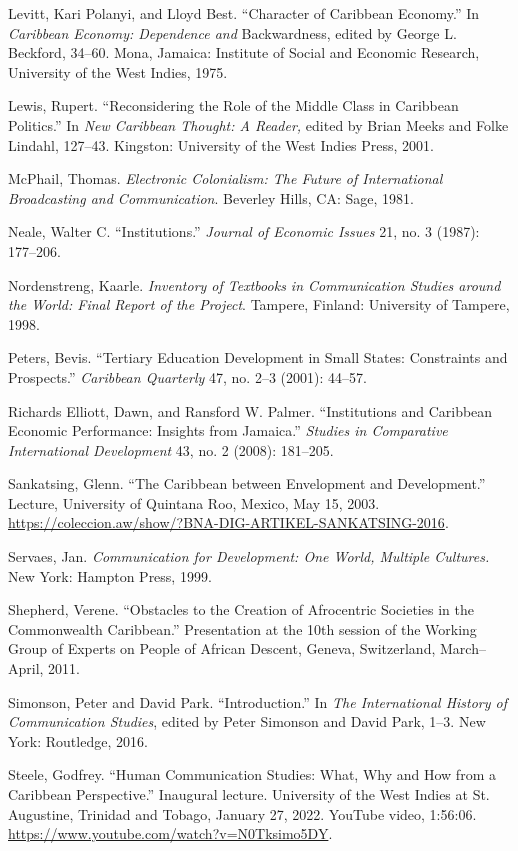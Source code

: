 \documentclass{tufte-handout}
\begin{document}
\begin{hangparas}{.25in}{1}
Levitt, Kari Polanyi, and Lloyd Best. ``Character of Caribbean
Economy.'' In \emph{Caribbean Economy: Dependence and} Backwardness,
edited by George L. Beckford, 34--60. Mona, Jamaica: Institute of Social
and Economic Research, University of the West Indies, 1975.

Lewis, Rupert. ``Reconsidering the Role of the Middle Class in Caribbean
Politics.'' In \emph{New Caribbean Thought: A Reader,} edited by Brian
Meeks and Folke Lindahl, 127--43. Kingston: University of the West
Indies Press, 2001.

McPhail, Thomas. \emph{Electronic Colonialism: The Future of
International Broadcasting and Communication}. Beverley Hills, CA: Sage,
1981.

Neale, Walter C. ``Institutions.'' \emph{Journal of Economic Issues} 21,
no. 3 (1987): 177--206.

Nordenstreng, Kaarle. \emph{Inventory of Textbooks in Communication
Studies around the World: Final Report of the Project}. Tampere,
Finland: University of Tampere, 1998.

Peters, Bevis. ``Tertiary Education Development in Small States:
Constraints and Prospects.'' \emph{Caribbean Quarterly} 47, no. 2--3
(2001): 44--57.

Richards Elliott, Dawn, and Ransford W. Palmer. ``Institutions and
Caribbean Economic Performance: Insights from Jamaica.'' \emph{Studies
in Comparative International Development} 43, no. 2 (2008): 181--205.

Sankatsing, Glenn. ``The Caribbean between Envelopment and
Development.'' Lecture, University of Quintana Roo, Mexico, May 15,
2003. \href{https://coleccion.aw/show/?BNA-DIG-ARTIKEL-SANKATSING-2016}{https://coleccion.aw/show/?BNA-DIG-ARTIKEL-SANKATSING-2016}.

Servaes, Jan. \emph{Communication for Development: One World, Multiple
Cultures.} New York: Hampton Press, 1999.

Shepherd, Verene. ``Obstacles to the Creation of Afrocentric Societies
in the Commonwealth Caribbean.'' Presentation at the 10th session of the
Working Group of Experts on People of African Descent, Geneva,
Switzerland, March--April, 2011.

Simonson, Peter and David Park. ``Introduction.'' In \emph{The
International History of Communication Studies}, edited by Peter
Simonson and David Park, 1--3. New York: Routledge, 2016.

Steele, Godfrey. ``Human Communication Studies: What, Why and How from a
Caribbean Perspective.'' Inaugural lecture. University of the West
Indies at St. Augustine, Trinidad and Tobago, January 27, 2022. YouTube
video, 1:56:06. \url{https://www.youtube.com/watch?v=N0Tksimo5DY}.


\end{hangparas}
\end{document}
